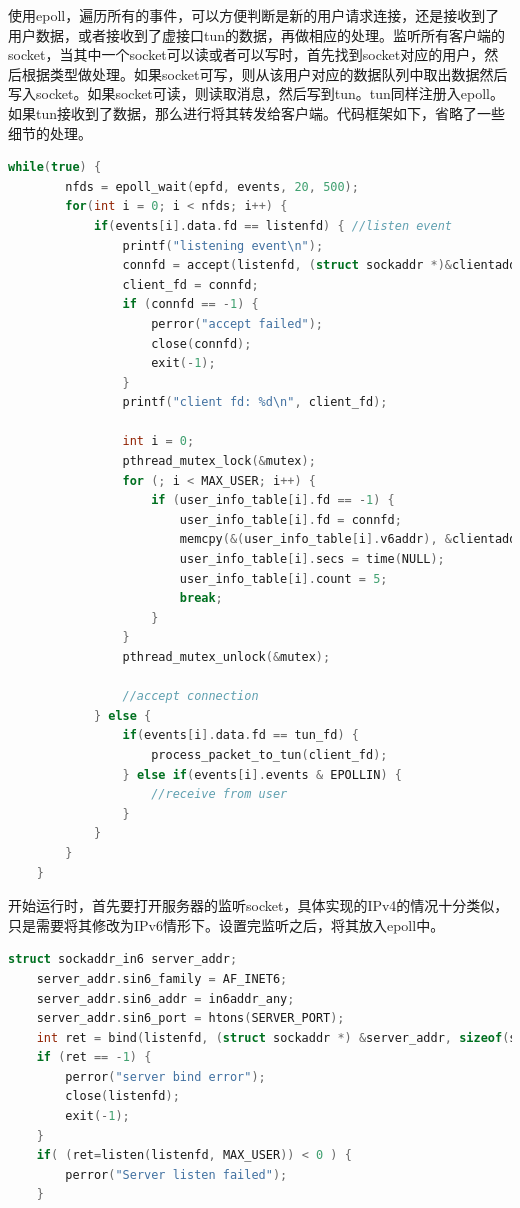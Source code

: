\documentclass[paper=a4, fontsize=11pt, UTF8]{article} %
\begin{document}
使用epoll，遍历所有的事件，可以方便判断是新的用户请求连接，还是接收到了用户数据，或者接收到了虚接口tun的数据，再做相应的处理。监听所有客户端的socket，当其中一个socket可以读或者可以写时，首先找到socket对应的用户，然后根据类型做处理。如果socket可写，则从该用户对应的数据队列中取出数据然后写入socket。如果socket可读，则读取消息，然后写到tun。tun同样注册入epoll。如果tun接收到了数据，那么进行将其转发给客户端。代码框架如下，省略了一些细节的处理。
\begin{lstlisting}[language=c++]
    while(true) {
        nfds = epoll_wait(epfd, events, 20, 500);
        for(int i = 0; i < nfds; i++) {
            if(events[i].data.fd == listenfd) { //listen event
                printf("listening event\n");
                connfd = accept(listenfd, (struct sockaddr *)&clientaddr, &client_len);
                client_fd = connfd;
                if (connfd == -1) {
                    perror("accept failed");
                    close(connfd);
                    exit(-1);
                }
                printf("client fd: %d\n", client_fd);

                int i = 0;
                pthread_mutex_lock(&mutex);
                for (; i < MAX_USER; i++) {
                    if (user_info_table[i].fd == -1) {
                        user_info_table[i].fd = connfd;
                        memcpy(&(user_info_table[i].v6addr), &clientaddr, sizeof(struct sockaddr));
                        user_info_table[i].secs = time(NULL);
                        user_info_table[i].count = 5;
                        break;
                    }
                }
                pthread_mutex_unlock(&mutex);

                //accept connection
            } else { 
                if(events[i].data.fd == tun_fd) {
                    process_packet_to_tun(client_fd);
                } else if(events[i].events & EPOLLIN) {
                    //receive from user
                }
            }
        }
    }
\end{lstlisting}
开始运行时，首先要打开服务器的监听socket，具体实现的IPv4的情况十分类似，只是需要将其修改为IPv6情形下。设置完监听之后，将其放入epoll中。
\begin{lstlisting}[language=c++]
    struct sockaddr_in6 server_addr;
    server_addr.sin6_family = AF_INET6;
    server_addr.sin6_addr = in6addr_any;
    server_addr.sin6_port = htons(SERVER_PORT);
    int ret = bind(listenfd, (struct sockaddr *) &server_addr, sizeof(server_addr));
    if (ret == -1) {
        perror("server bind error");
        close(listenfd);
        exit(-1);
    }
    if( (ret=listen(listenfd, MAX_USER)) < 0 ) {
        perror("Server listen failed");
    }
\end{lstlisting}
\end{document}
